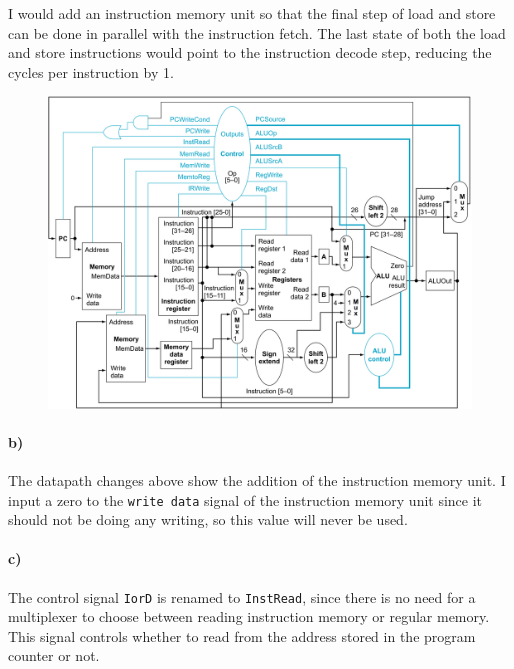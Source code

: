 \documentclass[12pt]{article}
\begin{document}
I would add an instruction memory unit so that the final step of load and store can be done in parallel with the instruction fetch. The last
state of both the load and store instructions would point to the instruction decode step, reducing the cycles per instruction by 1.

\begin{figure}[!ht]
    \begin{center}
        \includegraphics[width=4.8in]{problem5b.png}
    \end{center}
\end{figure}

\paragraph{b)}

The datapath changes above show the addition of the instruction memory unit. I input a zero to the \texttt{write data} signal of the instruction memory
unit since it should not be doing any writing, so this value will never be used.

\paragraph{c)}

The control signal \texttt{IorD} is renamed to \texttt{InstRead}, since there is no need for a multiplexer to choose between reading instruction memory or
regular memory. This signal controls whether to read from the address stored in the program counter or not.
\end{document}
